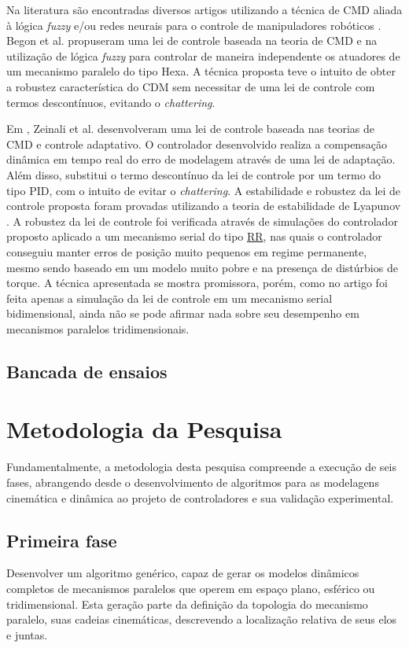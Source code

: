 \documentclass[]{politex}
\begin{document}
Na literatura são encontradas diversos artigos utilizando a técnica de CMD aliada à lógica {\em fuzzy} e/ou redes neurais para o controle de manipuladores robóticos \cite{Begon, Ertugrul, Hu, Sadati}. Begon et al. \cite{Begon} propuseram uma lei de controle baseada na teoria de CMD e na utilização de lógica {\em fuzzy} para controlar de maneira independente os atuadores de um mecanismo paralelo do tipo Hexa. A técnica proposta teve o intuito de obter a robustez característica do CDM sem necessitar de uma lei de controle com termos descontínuos, evitando o {\em chattering}.

Em \cite{Zeinali}, Zeinali et al. desenvolveram uma lei de controle  baseada nas teorias de CMD e controle adaptativo. O controlador desenvolvido realiza a compensação dinâmica em tempo real do erro de modelagem através de uma lei de adaptação. Além disso, substitui o termo descontínuo da lei de controle por um termo do tipo PID, com o intuito de evitar o {\em chattering}. A estabilidade e robustez da lei de controle proposta foram provadas utilizando a teoria de estabilidade de Lyapunov \cite{Slotini}. A robustez da lei de controle foi verificada através de simulações do controlador proposto aplicado a um mecanismo serial do tipo \underline{R}\underline{R}, nas quais o controlador conseguiu manter erros de posição muito pequenos em regime permanente, mesmo sendo baseado em um modelo muito pobre e na presença de distúrbios de torque. A técnica apresentada se mostra promissora, porém, como no artigo foi feita apenas a simulação da lei de controle em um mecanismo serial bidimensional, ainda não se pode afirmar nada sobre seu desempenho em mecanismos paralelos tridimensionais.

\section{Bancada de ensaios}

\chapter{Metodologia da Pesquisa}\label{method}

Fundamentalmente, a metodologia desta pesquisa compreende a execução de seis fases, abrangendo desde o desenvolvimento de algoritmos para as modelagens cinemática e dinâmica ao projeto de controladores e sua validação experimental.

\section{Primeira fase} 
Desenvolver um algoritmo genérico, capaz de gerar os modelos dinâmicos completos de mecanismos paralelos que operem em espaço plano, esférico ou tridimensional. Esta geração parte da definição da topologia do mecanismo paralelo, suas cadeias cinemáticas, descrevendo a localização relativa de seus elos e juntas. 
\end{document}
